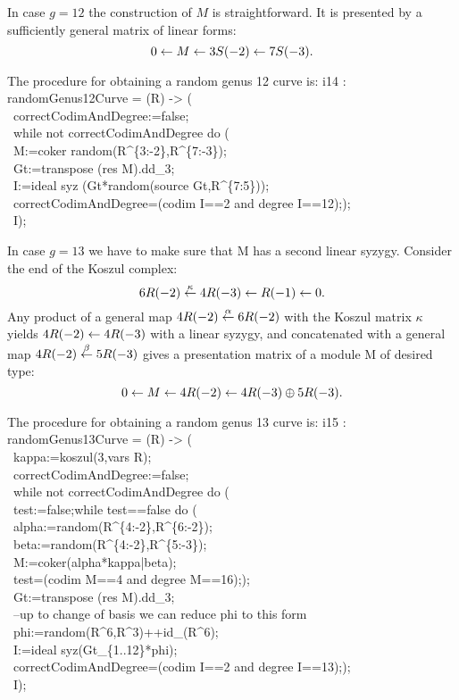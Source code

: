 In case $g=12$ the construction of $M$ is straightforward. 
It is presented by a sufficiently general matrix of linear forms:
$$0 \leftarrow M \leftarrow 3S(-2) \leftarrow 7S(-3).$$

\noindent
The procedure for obtaining a random genus 12 curve is:
\beginOutput
i14 : randomGenus12Curve = (R) -> (\\
\           correctCodimAndDegree:=false;\\
\           while not correctCodimAndDegree do (\\
\                M:=coker random(R^\{3:-2\},R^\{7:-3\});\\
\                Gt:=transpose (res M).dd_3;\\
\                I:=ideal syz (Gt*random(source Gt,R^\{7:5\}));\\
\                correctCodimAndDegree=(codim I==2 and degree I==12););\\
\           I);\\
\endOutput


\medskip
In case $g=13$ we have to make sure that M has a second linear syzygy. 
Consider the end of the Koszul complex:
$$6R(-2) \stackrel{\kappa}{\leftarrow} 4R(-3) \leftarrow R(-1) \leftarrow 0.$$
Any product of a general map $4R(-2) \stackrel{\alpha}{\leftarrow} 6R(-2)$ with 
the Koszul matrix $\kappa$ yields
$4R(-2) \leftarrow 4R(-3)$ with a linear syzygy, 
and concatenated with a general map $4R(-2) \stackrel{\beta}{\leftarrow} 5R(-3)$
gives a presentation matrix of a module M of desired type:
$$ 0 \leftarrow M \leftarrow 4R(-2) \leftarrow 4R(-3) \oplus 5R(-3).$$

\noindent
The procedure for obtaining a random genus 13 curve is:
\beginOutput
i15 : randomGenus13Curve = (R) -> (\\
\           kappa:=koszul(3,vars R);\\
\           correctCodimAndDegree:=false;\\
\           while not correctCodimAndDegree do (\\
\                test:=false;while test==false do ( \\
\                     alpha:=random(R^\{4:-2\},R^\{6:-2\});\\
\                     beta:=random(R^\{4:-2\},R^\{5:-3\});\\
\                     M:=coker(alpha*kappa|beta);\\
\                     test=(codim M==4 and degree M==16););\\
\                Gt:=transpose (res M).dd_3;\\
\                --up to change of basis we can reduce phi to this form\\
\                phi:=random(R^6,R^3)++id_(R^6);\\
\                I:=ideal syz(Gt_\{1..12\}*phi);\\
\                correctCodimAndDegree=(codim I==2 and degree I==13););\\
\           I);\\
\endOutput


